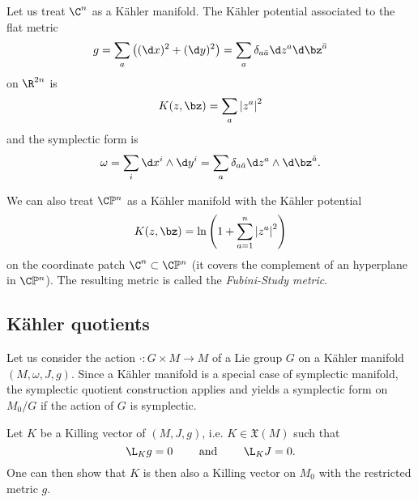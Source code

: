 \documentclass{worksheetclass}
\begin{document}
        \begin{examp}
            Let us treat $\C^n$ as a Kähler manifold. The Kähler potential associated to the flat metric
            \begin{equation}
                g = \sum_a \left( (\d x)^2+(\d y)^2 \right) = \sum_a \delta_{a\bar{a}}\d z^a\d\bz^{\bar{a}}
            \end{equation}
            on $\R^{2n}$ is
            \begin{equation}
                K(z,\bz) = \sum_a\abs{z^a}^2
            \end{equation}
            and the symplectic form is
            \begin{equation}
                \omega = \sum_i \d x^i\wedge\d y^i = \sum_a \delta_{a\bar{a}}\d z^a\wedge\d\bz^{\bar{a}}.
            \end{equation}
        \end{examp}

        \begin{examp}
            We can also treat $\C\mathbb{P}^n$ as a Kähler manifold with the Kähler potential
            \begin{equation}
                K(z,\bz) = \ln\left( 1+\sum^n_{a=1}\abs{z^a}^2 \right)
            \end{equation}
            on the coordinate patch $\C^n\subset\C\mathbb{P}^n$ (it covers the complement of an hyperplane in $\C\mathbb{P}^n$). The resulting metric is called the \emph{Fubini-Study metric}.
        \end{examp}

    \subsection{Kähler quotients}

        Let us consider the action $\cdot:G\times M\to M$ of a Lie group $G$ on a Kähler manifold $(M,\omega,J,g)$. Since a Kähler manifold is a special case of symplectic manifold, the symplectic quotient construction applies and yields a symplectic form on $M_0/G$ if the action of $G$ is symplectic.

        Let $K$ be a Killing vector of $(M,J,g)$, i.e. $K\in\mathfrak{X}(M)$ such that
        \begin{equation}
            \L_Kg=0\qquad\text{ and }\qquad \L_KJ=0.
        \end{equation}
        One can then show that $K$ is then also a Killing vector on $M_0$ with the restricted metric $g$.
\end{document}
